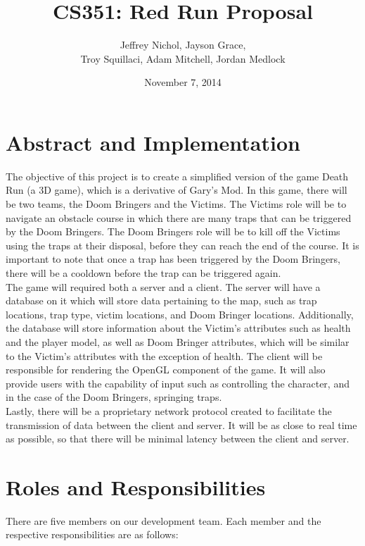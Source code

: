 \documentclass[12pt, a4paper, oneside]{article}
\begin{document}
\title{CS351: Red Run Proposal}
\author{Jeffrey Nichol, Jayson Grace, \\
Troy Squillaci, Adam Mitchell, Jordan Medlock}
\date{November 7, 2014}
\maketitle

\section*{Abstract and Implementation}

The objective of this project is to create a simplified version of the game Death Run (a 3D game), which is a derivative of Gary's Mod. In this game, there will be two teams, the Doom Bringers and the Victims. The Victims role will be to navigate an obstacle course in which there are many traps that can be triggered by the Doom Bringers. The Doom Bringers role will be to kill off the Victims using the traps at their disposal, before they can reach the end of the course. It is important to note that once a trap has been triggered by the Doom Bringers, there will be a cooldown before the trap can be triggered again. \\

The game will required both a server and a client. The server will have a database on it which will store data pertaining to the map, such as trap locations, trap type, victim locations, and Doom Bringer locations. Additionally, the database will store information about the Victim's attributes such as health and the player model, as well as Doom Bringer attributes, which will be similar to the Victim's attributes with the exception of health. The client will be responsible for rendering the OpenGL component of the game. It will also provide users with the capability of input such as controlling the character, and in the case of the Doom Bringers, springing traps. \\

Lastly, there will be a proprietary network protocol created to facilitate the transmission of data between the client and server. It will be as close to real time as possible, so that there will be minimal latency between the client and server.

\section*{Roles and Responsibilities}
There are five members on our development team. Each member and the respective responsibilities are as follows:
\end{document}
